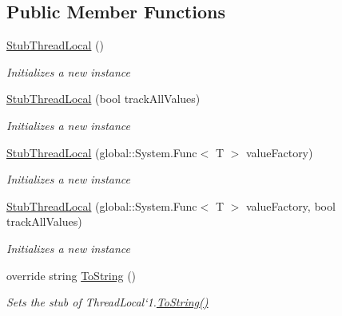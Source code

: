 \subsection*{Public Member Functions}
\begin{DoxyCompactItemize}
\item 
\hyperlink{class_system_1_1_threading_1_1_fakes_1_1_stub_thread_local_3_01_t_01_4_afeb5fc488ffe66f34af07b2c7832fdde}{Stub\-Thread\-Local} ()
\begin{DoxyCompactList}\small\item\em Initializes a new instance\end{DoxyCompactList}\item 
\hyperlink{class_system_1_1_threading_1_1_fakes_1_1_stub_thread_local_3_01_t_01_4_adc5838e0315226248ee8a1bdfab2d7a0}{Stub\-Thread\-Local} (bool track\-All\-Values)
\begin{DoxyCompactList}\small\item\em Initializes a new instance\end{DoxyCompactList}\item 
\hyperlink{class_system_1_1_threading_1_1_fakes_1_1_stub_thread_local_3_01_t_01_4_a79e2ad895ea5fbc0ff6cf312806a5b04}{Stub\-Thread\-Local} (global\-::\-System.\-Func$<$ T $>$ value\-Factory)
\begin{DoxyCompactList}\small\item\em Initializes a new instance\end{DoxyCompactList}\item 
\hyperlink{class_system_1_1_threading_1_1_fakes_1_1_stub_thread_local_3_01_t_01_4_acb00f6b0d02682f92d9b9de34a74a98d}{Stub\-Thread\-Local} (global\-::\-System.\-Func$<$ T $>$ value\-Factory, bool track\-All\-Values)
\begin{DoxyCompactList}\small\item\em Initializes a new instance\end{DoxyCompactList}\item 
override string \hyperlink{class_system_1_1_threading_1_1_fakes_1_1_stub_thread_local_3_01_t_01_4_ab08763e3a8a424b5e591eebac2ed842a}{To\-String} ()
\begin{DoxyCompactList}\small\item\em Sets the stub of Thread\-Local`1.\hyperlink{class_system_1_1_threading_1_1_fakes_1_1_stub_thread_local_3_01_t_01_4_ab08763e3a8a424b5e591eebac2ed842a}{To\-String()}\end{DoxyCompactList}\end{DoxyCompactItemize}
